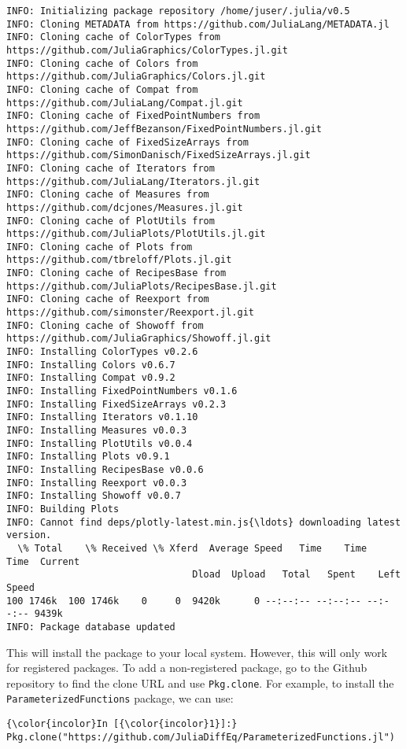 \documentclass[11pt]{article}
\begin{document}
    \begin{Verbatim}[commandchars=\\\{\}]
INFO: Initializing package repository /home/juser/.julia/v0.5
INFO: Cloning METADATA from https://github.com/JuliaLang/METADATA.jl
INFO: Cloning cache of ColorTypes from https://github.com/JuliaGraphics/ColorTypes.jl.git
INFO: Cloning cache of Colors from https://github.com/JuliaGraphics/Colors.jl.git
INFO: Cloning cache of Compat from https://github.com/JuliaLang/Compat.jl.git
INFO: Cloning cache of FixedPointNumbers from https://github.com/JeffBezanson/FixedPointNumbers.jl.git
INFO: Cloning cache of FixedSizeArrays from https://github.com/SimonDanisch/FixedSizeArrays.jl.git
INFO: Cloning cache of Iterators from https://github.com/JuliaLang/Iterators.jl.git
INFO: Cloning cache of Measures from https://github.com/dcjones/Measures.jl.git
INFO: Cloning cache of PlotUtils from https://github.com/JuliaPlots/PlotUtils.jl.git
INFO: Cloning cache of Plots from https://github.com/tbreloff/Plots.jl.git
INFO: Cloning cache of RecipesBase from https://github.com/JuliaPlots/RecipesBase.jl.git
INFO: Cloning cache of Reexport from https://github.com/simonster/Reexport.jl.git
INFO: Cloning cache of Showoff from https://github.com/JuliaGraphics/Showoff.jl.git
INFO: Installing ColorTypes v0.2.6
INFO: Installing Colors v0.6.7
INFO: Installing Compat v0.9.2
INFO: Installing FixedPointNumbers v0.1.6
INFO: Installing FixedSizeArrays v0.2.3
INFO: Installing Iterators v0.1.10
INFO: Installing Measures v0.0.3
INFO: Installing PlotUtils v0.0.4
INFO: Installing Plots v0.9.1
INFO: Installing RecipesBase v0.0.6
INFO: Installing Reexport v0.0.3
INFO: Installing Showoff v0.0.7
INFO: Building Plots
INFO: Cannot find deps/plotly-latest.min.js{\ldots} downloading latest version.
  \% Total    \% Received \% Xferd  Average Speed   Time    Time     Time  Current
                                 Dload  Upload   Total   Spent    Left  Speed
100 1746k  100 1746k    0     0  9420k      0 --:--:-- --:--:-- --:--:-- 9439k
INFO: Package database updated

    \end{Verbatim}

    This will install the package to your local system. However, this will
only work for registered packages. To add a non-registered package, go
to the Github repository to find the clone URL and use
\texttt{Pkg.clone}. For example, to install the
\texttt{ParameterizedFunctions} package, we can use:

    \begin{Verbatim}[commandchars=\\\{\}]
{\color{incolor}In [{\color{incolor}1}]:} Pkg.clone("https://github.com/JuliaDiffEq/ParameterizedFunctions.jl")
\end{Verbatim}
\end{document}
